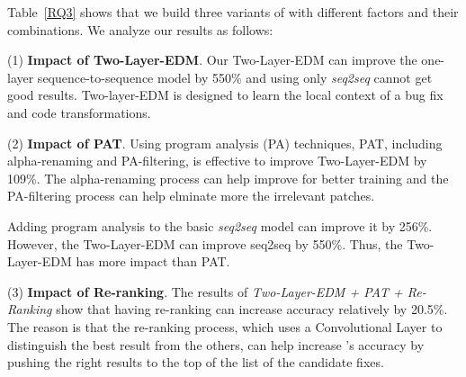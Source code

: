 
Table~\ref{RQ3} shows that we build three variants of {\tool} with
different factors and their combinations.  We analyze our results as
follows:

(1) \textbf{Impact of Two-Layer-EDM}. Our Two-Layer-EDM
can improve the one-layer sequence-to-sequence model by 550\% and
using only {\em seq2seq} cannot get good results. Two-layer-EDM is
designed to learn the local context of a bug fix and code
transformations.

(2) \textbf{Impact of PAT}. Using program analysis (PA) techniques,
PAT, including alpha-renaming and PA-filtering, is effective to
improve Two-Layer-EDM by 109\%.
The alpha-renaming process can help improve {\tool} for better training
and the PA-filtering process can help elminate more the irrelevant patches.

Adding program analysis to the basic {\em seq2seq} model can improve
it by 256\%. However, the Two-Layer-EDM can improve seq2seq by 550\%.
Thus, the Two-Layer-EDM has more impact than PAT.

(3) \textbf{Impact of Re-ranking}. The results
of \textit{Two-Layer-EDM + PAT + Re-Ranking} show that having
re-ranking can increase accuracy relatively by 20.5\%. The reason is
that the re-ranking process, which uses a Convolutional Layer to
distinguish the best result from the others, can help increase
{\tool}'s accuracy by pushing the right results to the top of the list
of the candidate fixes.

\fi

